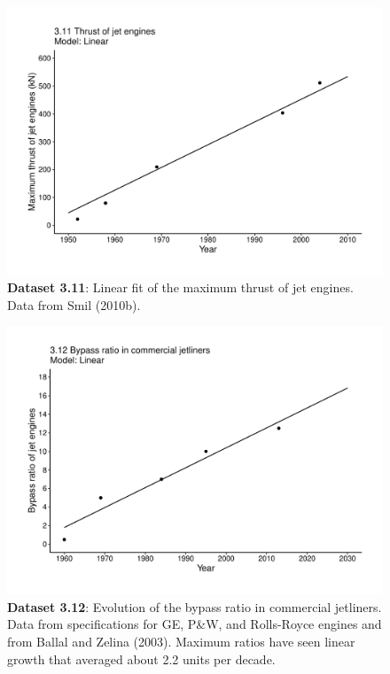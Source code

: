 \documentclass[aps,rmp,preprint,superscriptaddress,10pt,onecolumn]{article}
\begin{document}
\clearpage
\begin{figure}[h]
\includegraphics[width=\textwidth]{output/figs-ggplot/3.11.pdf}
\caption{\textbf{Dataset 3.11}: Linear fit of the maximum thrust of jet engines. Data from Smil (2010b).}
\end{figure}
	
\clearpage
\begin{figure}[h]
\includegraphics[width=\textwidth]{output/figs-ggplot/3.12.pdf}
\caption{\textbf{Dataset 3.12}: Evolution of the bypass ratio in commercial jetliners. Data from specifications for GE, P\&W, and Rolls-Royce engines and from Ballal and Zelina (2003). Maximum ratios have seen linear growth that averaged about 2.2 units per decade.}
\end{figure}
	
\end{document}
